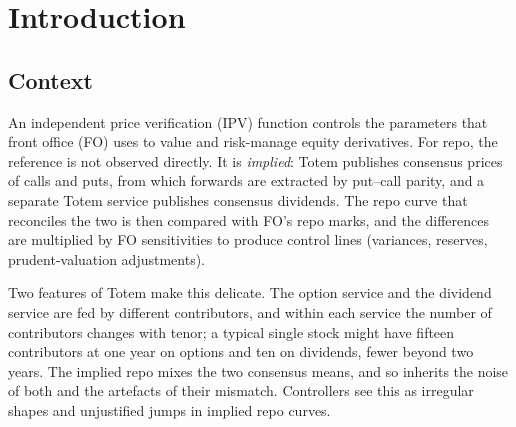 \section{Introduction}\label{sec-intro}

\subsection{Context}
An independent price verification (IPV) function controls the parameters that front office (FO) uses to value
and risk-manage equity derivatives. For repo, the reference is not observed directly. It is \emph{implied}: Totem
publishes consensus prices of calls and puts, from which forwards are extracted by put--call parity, and a
separate Totem service publishes consensus dividends. The repo curve that reconciles the two is then compared with
FO's repo marks, and the differences are multiplied by FO sensitivities to produce control lines (variances,
reserves, prudent-valuation adjustments).

Two features of Totem make this delicate. The option service and the dividend service are fed by different
contributors, and within each service the number of contributors changes with tenor; a typical single stock might
have fifteen contributors at one year on options and ten on dividends, fewer beyond two years. The implied repo
mixes the two consensus means, and so inherits the noise of both and the artefacts of their mismatch. Controllers
see this as irregular shapes and unjustified jumps in implied repo curves.

